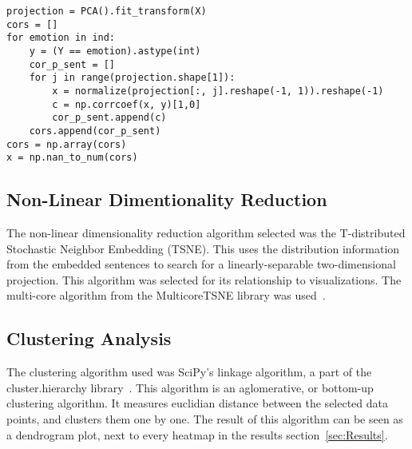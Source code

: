 \begin{lstlisting}[caption={PCA correlation Algorithm},label=lst:pca,frame=single]
projection = PCA().fit_transform(X)
cors = []
for emotion in ind:
    y = (Y == emotion).astype(int)
    cor_p_sent = []
    for j in range(projection.shape[1]):
        x = normalize(projection[:, j].reshape(-1, 1)).reshape(-1)
        c = np.corrcoef(x, y)[1,0]
        cor_p_sent.append(c)
    cors.append(cor_p_sent)
cors = np.array(cors)
x = np.nan_to_num(cors)
\end{lstlisting}


\subsection{Non-Linear Dimentionality Reduction}\label{sub:Non-Linear Dimentionality Reduction}
The non-linear dimensionality reduction algorithm selected was the T-distributed Stochastic Neighbor Embedding (TSNE). This uses the distribution information from the embedded sentences to search for a linearly-separable two-dimensional projection. This algorithm was selected for its relationship to visualizations. The multi-core algorithm from the MulticoreTSNE library was used~\cite{ulyanov2016tsne}.


\subsection{Clustering Analysis}\label{sub:Clustering Analysis}
The clustering algorithm used was SciPy's linkage algorithm, a part of the cluster.hierarchy library~\cite{scipy2020}. This algorithm is an aglomerative, or bottom-up clustering algorithm. It measures euclidian distance between the selected data points, and clusters them one by one. The result of this algorithm can be seen as a dendrogram plot, next to every heatmap in the results section~\ref{sec:Results}.
